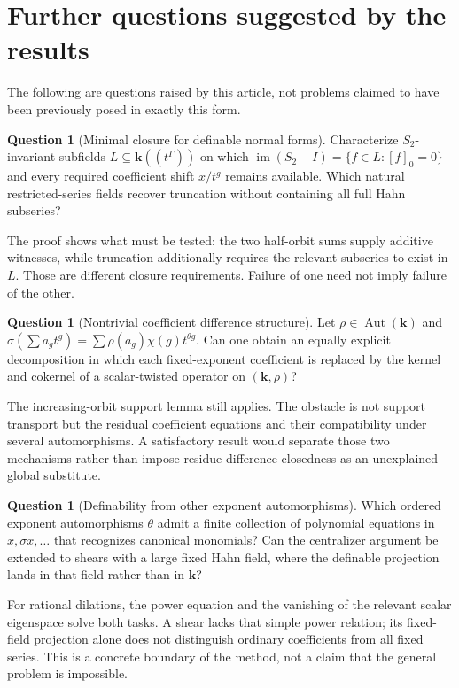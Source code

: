 \documentclass[11pt,oneside]{article}
\numberwithin{equation}{section}
\theoremstyle{definition}
\newtheorem{question}[theorem]{Question}
\theoremstyle{remark}
\newcommand{\kk}{\mathbf k}
\newcommand{\Aut}{\operatorname{Aut}}
\newcommand{\im}{\operatorname{im}}
\begin{document}
\section{Further questions suggested by the results}\label{dsup:sec:questions}

The following are questions raised by this article, not problems claimed
to have been previously posed in exactly this form.

\begin{question}[Minimal closure for definable normal forms]
Characterize $S_2$-invariant subfields $L\subseteq\kk((t^\Gamma))$ on which
$\im(S_2-I)=\{f\in L:[f]_0=0\}$ and every required coefficient shift
$x/t^g$ remains available. Which natural restricted-series fields recover
truncation without containing all full Hahn subseries?
\end{question}

The proof shows what must be tested: the two half-orbit sums supply
additive witnesses, while truncation additionally requires the relevant
subseries to exist in $L$. Those are different closure requirements.
Failure of one need not imply failure of the other.

\begin{question}[Nontrivial coefficient difference structure]
Let $\rho\in\Aut(\kk)$ and
$\sigma(\sum a_gt^g)=\sum\rho(a_g)\chi(g)t^{\theta g}$. Can one obtain an
equally explicit decomposition in which each fixed-exponent coefficient
is replaced by the kernel and cokernel of a scalar-twisted operator on
$(\kk,\rho)$?
\end{question}

The increasing-orbit support lemma still applies. The obstacle is not
support transport but the residual coefficient equations and their
compatibility under several automorphisms. A satisfactory result would
separate those two mechanisms rather than impose residue difference
closedness as an unexplained global substitute.

\begin{question}[Definability from other exponent automorphisms]
Which ordered exponent automorphisms $\theta$ admit a finite collection
of polynomial equations in $x,\sigma x,\ldots$ that recognizes canonical
monomials? Can the centralizer argument be extended to shears with a
large fixed Hahn field, where the definable projection lands in that
field rather than in $\kk$?
\end{question}

For rational dilations, the power equation and the vanishing of the
relevant scalar eigenspace solve both tasks. A shear lacks that simple
power relation; its fixed-field projection alone does not distinguish
ordinary coefficients from all fixed series. This is a concrete boundary
of the method, not a claim that the general problem is impossible.
\end{document}
